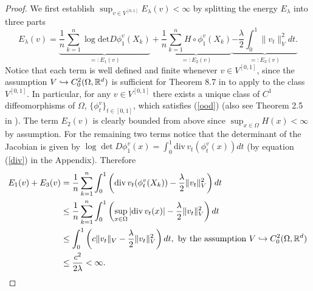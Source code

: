 \documentclass[noinfoline]{imsart}
\begin{document}
\begin{proof}



We first establish $\sup_{v\in V^{[0,1]}}E_\lambda(v)<\infty$ by splitting the energy $E_\lambda$ into three parts
\begin{equation}
\label{decomp}
E_\lambda(v)=\underbrace{\frac{1}{n}\sum_{k=1}^n   \log\text{det} D\phi_1^v(X_k) }_{=:E_1(v)}+ \underbrace{\frac{1}{n}\sum_{k=1}^n H\circ\phi_1^v(X_k)}_{=:E_2(v)}  \underbrace{-\frac{\lambda}{2} \int_0^1 \| v_t \|_V^2 dt.}_{=:E_3(v)}
\end{equation}
Notice that each term is well defined and finite whenever $v\in V^{[0,1]}$, since
the assumption $V\hookrightarrow C_0^2(\Omega, \Bbb R^d)$ is sufficient for  Theorem 8.7   in \cite{you:10} to apply to the class  $ V^{[0,1]}$. In particular, for any  $v\in V^{[0,1]}$  there exists a unique class of $C^1$ diffeomorphisms of $\Omega$, $\{\phi_t^v\}_{t\in [0,1]}$, which satisfies (\ref{ood}) (also see Theorem 2.5 in \cite{dup:98}).
The term $E_2(v)$ is clearly bounded from above since  $\sup_{x\in\Omega}H(x)<\infty$ by assumption.
For the remaining two terms notice that  the determinant of the Jacobian is given by   $ \log\det D\phi_1^v(x)  = \int_0^1  \text{div}\,  v_t (\phi_t^v(x))dt$ (by equation (\ref{div}) in the Appendix).
Therefore
\begin{align}
E_1(v) + E_3(v) & = \frac{1}{n}\sum_{k=1}^n   \int_0^1 \left(  \text{div}\,  v_t (\phi_t^v(X_k))  - \frac{\lambda}{2}   \| v_t \|_V^2
\right)dt \nonumber\\
 & \leq \frac{1}{n}\sum_{k=1}^n   \int_0^1 \left( \sup_{x\in \Omega} |\text{div}\,  v_t (x)|  - \frac{\lambda}{2}   \| v_t \|_V^2
\right)dt \nonumber \\
 & \leq    \int_0^1 \left( c\| v_t \|_V  - \frac{\lambda}{2}   \| v_t \|_V^2
\right)dt, \,\,\text{by the assumption $V\hookrightarrow C_0^2(\Omega, \Bbb R^d)$} \nonumber \\
& \leq \frac{c^2}{2\lambda}<\infty. \nonumber
\end{align}


\end{proof}
\end{document}
